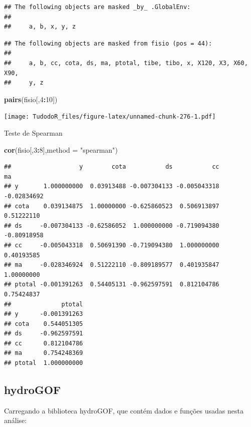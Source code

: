 \documentclass[
]{book}
\newenvironment{Shaded}{\begin{snugshade}}{\end{snugshade}}
\newcommand{\DataTypeTok}[1]{\textcolor[rgb]{0.13,0.29,0.53}{#1}}
\newcommand{\DecValTok}[1]{\textcolor[rgb]{0.00,0.00,0.81}{#1}}
\newcommand{\KeywordTok}[1]{\textcolor[rgb]{0.13,0.29,0.53}{\textbf{#1}}}
\newcommand{\NormalTok}[1]{#1}
\newcommand{\OperatorTok}[1]{\textcolor[rgb]{0.81,0.36,0.00}{\textbf{#1}}}
\newcommand{\StringTok}[1]{\textcolor[rgb]{0.31,0.60,0.02}{#1}}
\begin{document}
\begin{verbatim}
## The following objects are masked _by_ .GlobalEnv:
## 
##     a, b, x, y, z
\end{verbatim}

\begin{verbatim}
## The following objects are masked from fisio (pos = 44):
## 
##     a, b, cc, cota, ds, ma, ptotal, tibe, tibo, x, X120, X3, X60, X90,
##     y, z
\end{verbatim}

\begin{Shaded}
\begin{Highlighting}[]
\KeywordTok{pairs}\NormalTok{(fisio[,}\DecValTok{4}\OperatorTok{:}\DecValTok{10}\NormalTok{])}
\end{Highlighting}
\end{Shaded}

\texttt{[image: TudodoR\_files/figure-latex/unnamed-chunk-276-1.pdf]}

Teste de Spearman

\begin{Shaded}
\begin{Highlighting}[]
\KeywordTok{cor}\NormalTok{(fisio[,}\DecValTok{3}\OperatorTok{:}\DecValTok{8}\NormalTok{],}\DataTypeTok{method =} \StringTok{"spearman"}\NormalTok{)}
\end{Highlighting}
\end{Shaded}

\begin{verbatim}
##                   y        cota           ds           cc          ma
## y       1.000000000  0.03913488 -0.007304133 -0.005043318 -0.02834692
## cota    0.039134875  1.00000000 -0.625860523  0.506913897  0.51222110
## ds     -0.007304133 -0.62586052  1.000000000 -0.719094380 -0.80918958
## cc     -0.005043318  0.50691390 -0.719094380  1.000000000  0.40193585
## ma     -0.028346924  0.51222110 -0.809189577  0.401935847  1.00000000
## ptotal -0.001391263  0.54405131 -0.962597591  0.812104786  0.75424837
##              ptotal
## y      -0.001391263
## cota    0.544051305
## ds     -0.962597591
## cc      0.812104786
## ma      0.754248369
## ptotal  1.000000000
\end{verbatim}

\hypertarget{hydrogof}{%
\subsection{hydroGOF}\label{hydrogof}}

Carregando a biblioteca hydroGOF, que contém dados e funções usadas nesta análise:
\end{document}
